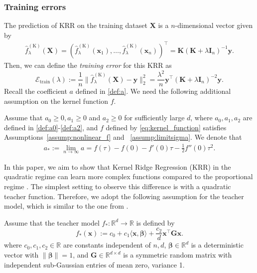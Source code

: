 \documentclass[twoside,11pt]{article}
\newcommand{\by}{\boldsymbol{y}}
\newcommand{\R}{\mathbb{R}}
\def\bI{{\mathbf I}}
\def\bG{{\boldsymbol G}}
\def\bK{{\boldsymbol K}}
\def\bX{{\boldsymbol X}}
\def\bx{{\boldsymbol x}}
\def\by{{\boldsymbol y}}
\def\bbeta{{\boldsymbol \beta}}
\def\cE{{\mathcal E}}
\def\K{{\mathbb K}}
\def\K{{\mathbb K}}
\renewcommand{\bK}{\boldsymbol{K}}
\renewcommand{\K}{\text{K}}
\newcommand{\train}{\text{train}}
\newcommand{\1}{\mathbf{1}}
\begin{document}
\subsubsection{Training  errors}
The prediction of KRR on the training dataset $\bX$ is a $n$-dimensional vector given by
\begin{align}\label{eq:predictor}
\hat f^{(\K)}_\lambda( \bX)=(\hat f^{(\K)}_\lambda(\bx_1),\ldots,\hat f^{(\K)}_\lambda(\bx_n))^\top=\bK(\bK+\lambda\bI_n)^{-1}\by.
\end{align}
Then, we can define the \textit{training error} for this KRR as
\begin{equation}\label{eq:Etrain}
    \cE_{\train}(\lambda):=\frac{1}{n}\|\hat f^{(\K)}_\lambda( \bX)- \by\|_2^2=\frac{\lambda^2}{n}\by^\top(\bK +\lambda\bI_n)^{-2} \by.
\end{equation}
Recall the coefficient $a$ defined in \eqref{def:a}. We need the following additional assumption on the kernel function $f$.
\begin{assumption}\label{assump:analytic}
Assume that $a_0\ge 0, a_1\ge 0$ and $a_2\ge0$ for sufficiently large $d$, where $a_0,a_1,a_2$ are defined in \eqref{def:a0}-\eqref{def:a2}, and $f$ defined by \eqref{eq:kernel_function} satisfies Assumptions~\ref{assump:nonlinear_f} and ~\ref{assump:limitsigma}. We denote that
\begin{align}\label{def:a_star}
    a_*:=\lim_{n\to\infty} a=f(\tau)-f(0)-f'(0)\tau -\frac{1}{2} f''(0)\tau^2.
\end{align} 
\end{assumption}

In this paper, we aim to show that Kernel Ridge Regression (KRR) in the quadratic regime can learn more complex functions compared to the proportional regime \citep{el2010spectrum, bartlett2021deep}. The simplest setting to observe this difference is with a quadratic teacher function. Therefore, we adopt the following assumption for the teacher model, which is similar to the one from \cite{mei2019generalization}.
\begin{assumption}\label{assump:teacher}
Assume that the teacher model $f_*:\R^d\to\R$ is defined by
\begin{equation}\label{eq:teacher} 
    f_*(\bx):= c_0+c_1\langle \bx, \bbeta\rangle +\frac{c_2}{d} \bx^\top\bG\bx.
\end{equation}
where $c_0, c_1,c_2\in \R$ are constants independent of $n,d$, $\bbeta\in \R^d$ is a deterministic vector with $\|\bbeta\|=1$,  and $\bG\in \mathbb R^{d\times d}$ is a symmetric random matrix with independent sub-Gaussian entries of mean zero, variance 1.  
\end{assumption}
\end{document}
